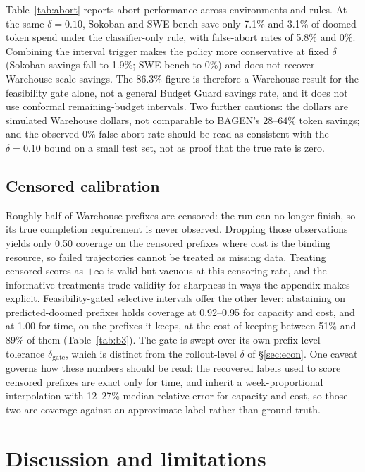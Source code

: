 \documentclass{article}
\newcommand{\bg}{Budget Guard}
\begin{document}
Table~\ref{tab:abort} reports abort performance across environments and rules. At the
same $\delta{=}0.10$, Sokoban and SWE-bench save only 7.1\% and 3.1\% of doomed token
spend under the classifier-only rule, with false-abort rates of 5.8\% and 0\%.
Combining the interval trigger makes the policy more conservative at fixed $\delta$
(Sokoban savings fall to 1.9\%; SWE-bench to 0\%) and does not recover Warehouse-scale
savings. The 86.3\% figure is therefore a Warehouse result for the feasibility gate
alone, not a general \bg{} savings rate, and it does not use conformal remaining-budget
intervals. Two further cautions: the dollars are simulated Warehouse dollars, not
comparable to BAGEN's 28--64\% token savings; and the observed 0\% false-abort rate
should be read as consistent with the $\delta{=}0.10$ bound on a small test set, not as
proof that the true rate is zero.

\subsection{Censored calibration}
\label{sec:censoring}

Roughly half of Warehouse prefixes are censored: the run can no longer finish, so its
true completion requirement is never observed. Dropping those observations yields only
0.50 coverage on the censored prefixes where cost is the binding resource, so failed
trajectories cannot be treated as missing data. Treating censored scores as $+\infty$
is valid but vacuous at this censoring rate, and the informative treatments trade
validity for sharpness in ways the appendix makes explicit. Feasibility-gated selective
intervals offer the other lever: abstaining on predicted-doomed prefixes holds coverage
at 0.92--0.95 for capacity and cost, and at 1.00 for time, on the prefixes it keeps, at
the cost of keeping between 51\% and 89\% of them (Table~\ref{tab:b3}). The gate is
swept over its own prefix-level tolerance $\delta_{\mathrm{gate}}$, which is distinct
from the rollout-level $\delta$ of \S\ref{sec:econ}. One caveat governs how these
numbers should be read: the recovered labels used to score censored prefixes are exact
only for time, and inherit a week-proportional interpolation with 12--27\% median
relative error for capacity and cost, so those two are coverage against an approximate
label rather than ground truth.

\section{Discussion and limitations}
\label{sec:limits}
\end{document}
